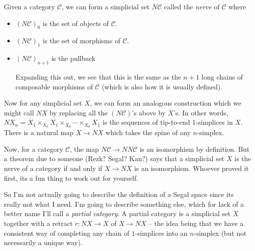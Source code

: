 \documentclass{amsart}
\begin{document}
Given a category $\mathcal{C}$, we can form a simplicial set $N\mathcal{C}$ called the \emph{nerve} of $\mathcal{C}$ where
\begin{itemize}
    \item $(N\mathcal{C})_0$ is the set of objects of $\mathcal{C}$.
    \item $(N\mathcal{C})_1$ is the set of morphisms of $\mathcal{C}$.
    \item $(N\mathcal{C})_{n + 1}$ is the pullback
    \begin{center}
    Expanding this out, we see that this is the same as the $n+1$ long chains of composable morphisms of $\mathcal{C}$ (which is also how it is usually defined).
    \end{center}
\end{itemize}

Now for any simplicial set $X$, we can form an analogous construction which we might call $NX$ by replacing all the $(N\mathcal{C})$'s above by $X$'s. In other words, $NX_n = X_1 \times_{X_0} X_1 \times_{X_0} \cdots \times_{X_0} X_1$ is the sequences of tip-to-end 1-simplices in $X$. There is a natural map $X \to NX$ which takes the spine of any $n$-simplex.

Now, for a category $\mathcal{C}$, the map $N\mathcal{C} \to NN\mathcal{C}$ is an isomorphism by definition. But a theorem due to someone (Rezk? Segal? Kan?) says that a simplicial set $X$ is the nerve of a category if and only if $X \to NX$ is an isomorphism. Whoever proved it first, its a fun thing to work out for yourself.

So I'm not actually going to describe the definition of a Segal space since its really not what I need. I'm going to describe something else, which for lack of a better name I'll call a \emph{partial category}. A partial category is a simplicial set $X$ together with a retract $r : NX \to X$ of $X \to NX$ -- the idea being that we have a consistent way of completing any chain of $1$-simplices into an $n$-simplex (but not necessarily a unique way).
\end{document}
